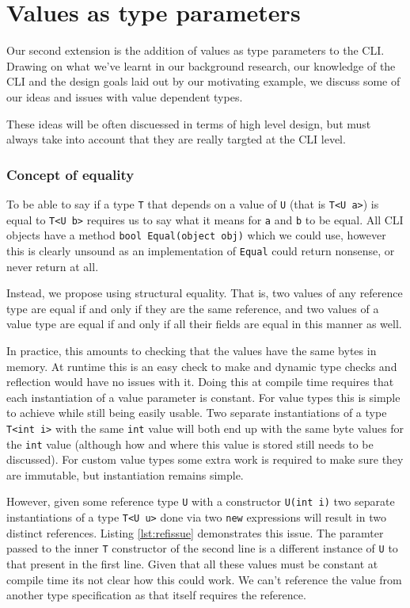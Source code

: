 \chapter{Values as type parameters}

Our second extension is the addition of values as type parameters to the CLI.
Drawing on what we've learnt in our background research, our knowledge of the 
CLI and the design goals laid out by our motivating example, we discuss some of
our ideas and issues with value dependent types.

These ideas will be often discuessed in terms of high level design, but 
must always take into account that they are really targted at the CLI level.

\subsection{Concept of equality}

To be able to say if a type \texttt{T} that depends on a value of
\texttt{U} (that is \texttt{T<U a>}) is equal to \texttt{T<U b>} requires
us to say what it means for \texttt{a} and \texttt{b} to be equal.
All CLI objects have a method \texttt{bool Equal(object obj)} which
we could use, however this is clearly unsound as an implementation
of \texttt{Equal} could return nonsense, or never return at all.

Instead, we propose using structural equality. That is,
two values of any reference type are equal if and only if they are
the same reference, and two values of a value type are equal if and
only if all their fields are equal in this manner as well. 

In practice, this amounts to checking that the values have the same bytes in memory.
At runtime this is an easy check to make and dynamic type checks and reflection would have
no issues with it. Doing this at compile time requires that each instantiation of a value 
parameter is constant. For value types this is simple to achieve while still being easily usable.
Two separate instantiations of a type \texttt{T<int i>} with the same \texttt{int} value will both end 
up with the same byte values for the \texttt{int} value (although how and where this value is stored 
still needs to be discussed). For custom value types some extra work is required to make sure they are
immutable, but instantiation remains simple. 

However, given some reference type \texttt{U} with a constructor \texttt{U(int i)} two separate instantiations of 
a type \texttt{T<U u>} done via two \texttt{new} expressions will result in two distinct references. 
Listing \ref{lst:refissue} demonstrates this issue. The paramter passed to the inner \texttt{T} constructor of the second 
line is a different instance of \texttt{U} to that present in the first line.
Given that all these values must be constant at compile time its not clear how this could work. We can't 
reference the value from another type specification as that itself requires the reference.

